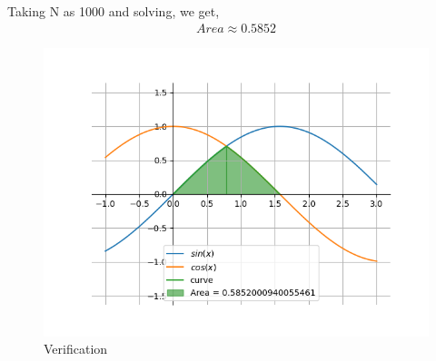 \documentclass[journal]{IEEEtran}
\begin{document}
    Taking N as 1000 and solving, we get,
    \begin{align}
        Area \approx 0.5852
    \end{align}

    \begin{figure}[ht]  
        \centering  
        \includegraphics[width=\columnwidth]{figs/fig1.png}  
        \caption{Verification}
    \end{figure}
\end{document}
